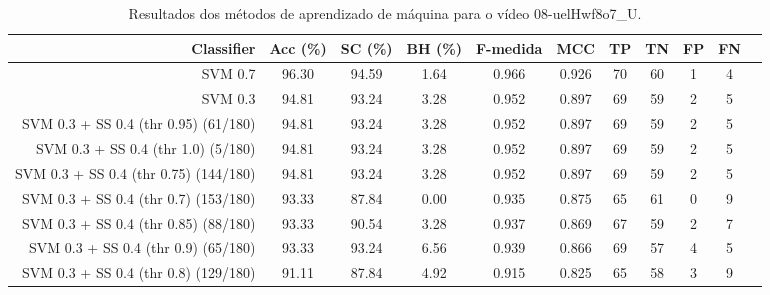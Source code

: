 \begin{table}[!htb]
\centering
\caption{Resultados dos métodos de aprendizado de máquina para o vídeo 08-uelHwf8o7_U.}
\label{tab:08-uelHwf8o7_U}
\begin{tabular}{r|c|c|c|c|c|c|c|c|c|c}
\hline\hline
Classifier & Acc (\%) & SC (\%) & BH (\%) & F-medida & MCC & TP & TN & FP & FN \\ \hline
SVM 0.7 & 96.30 & 94.59 & 1.64 & 0.966 & 0.926 & 70 & 60 & 1 & 4 \\ 
SVM 0.3 & 94.81 & 93.24 & 3.28 & 0.952 & 0.897 & 69 & 59 & 2 & 5 \\ 
SVM 0.3 + SS 0.4 (thr 0.95) (61/180) & 94.81 & 93.24 & 3.28 & 0.952 & 0.897 & 69 & 59 & 2 & 5 \\ 
SVM 0.3 + SS 0.4 (thr 1.0) (5/180) & 94.81 & 93.24 & 3.28 & 0.952 & 0.897 & 69 & 59 & 2 & 5 \\ 
SVM 0.3 + SS 0.4 (thr 0.75) (144/180) & 94.81 & 93.24 & 3.28 & 0.952 & 0.897 & 69 & 59 & 2 & 5 \\ 
SVM 0.3 + SS 0.4 (thr 0.7) (153/180) & 93.33 & 87.84 & 0.00 & 0.935 & 0.875 & 65 & 61 & 0 & 9 \\ 
SVM 0.3 + SS 0.4 (thr 0.85) (88/180) & 93.33 & 90.54 & 3.28 & 0.937 & 0.869 & 67 & 59 & 2 & 7 \\ 
SVM 0.3 + SS 0.4 (thr 0.9) (65/180) & 93.33 & 93.24 & 6.56 & 0.939 & 0.866 & 69 & 57 & 4 & 5 \\ 
SVM 0.3 + SS 0.4 (thr 0.8) (129/180) & 91.11 & 87.84 & 4.92 & 0.915 & 0.825 & 65 & 58 & 3 & 9 \\ 
\hline\hline
\end{tabular}
\end{table}
